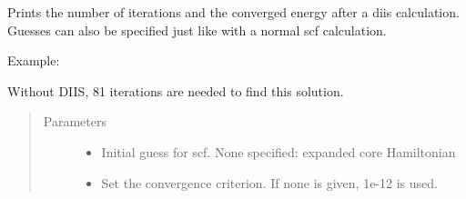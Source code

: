 \documentclass[letterpaper,10pt,english]{sphinxmanual}
\begin{document}
\begin{fulllineitems}

\begin{fulllineitems}
\label{\detokenize{GHF:hf.HartreeFock.GHF.MF.get_scf_solution_diis}}
Prints the number of iterations and the converged energy after a diis calculation. Guesses can also be specified
just like with a normal scf calculation.

Example:

\begin{sphinxVerbatim}[commandchars=\\\{\}]
   
          
   
  
\end{sphinxVerbatim}

Without DIIS, 81 iterations are needed to find this solution.
\begin{quote}\begin{description}
\item[{Parameters}] \leavevmode\begin{itemize}
\item {} 
 \textendash{} Initial guess for scf. None specified: expanded core Hamiltonian

\item {} 
 \textendash{} Set the convergence criterion. If none is given, 1e-12 is used.


\end{itemize}
\end{description}
\end{quote}
\end{fulllineitems}
\end{fulllineitems}
\end{document}

